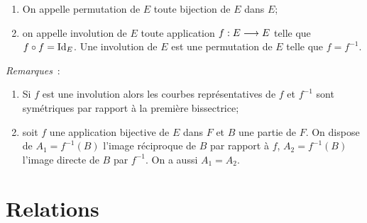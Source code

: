 %
\begin{defdef}
    \begin{enumerate}
        \item On appelle permutation de \(E\) toute bijection de \(E\) dans \(E\);
        \item on appelle involution de \(E\) toute application \(f:E \longrightarrow E\) telle que \(f \circ f=\operatorname{Id}_E\). Une involution de \(E\) est une 
            permutation de \(E\) telle que \(f=f^{-1}\).
    \end{enumerate}
\end{defdef}
%
\emph{Remarques}~:
\begin{enumerate}
    \item Si \(f\) est une involution alors les courbes représentatives de \(f\) 
        et \(f^{-1}\) sont symétriques par rapport à la première bissectrice;
    \item soit \(f\) une application bijective de \(E\) dans \(F\) et \(B\) une 
        partie de \(F\). On dispose de \(A_1=f^{-1}(B)\) l'image réciproque de 
        \(B\) par rapport à \(f\), \(A_2=f^{-1}(B)\) l'image directe de \(B\) 
        par \(f^{-1}\). On a aussi \(A_1=A_2\).
\end{enumerate}
%
\section{Relations}
\label{chap3-sec:relations}
